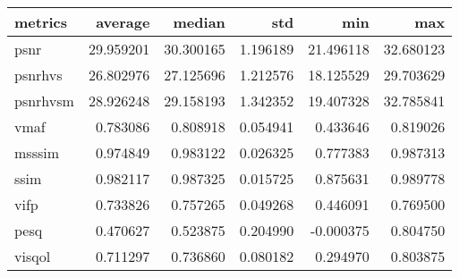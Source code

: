\begin{tabular}{lrrrrr}
\toprule
metrics & average & median & std & min & max \\
\midrule
psnr & 29.959201 & 30.300165 & 1.196189 & 21.496118 & 32.680123 \\
psnrhvs & 26.802976 & 27.125696 & 1.212576 & 18.125529 & 29.703629 \\
psnrhvsm & 28.926248 & 29.158193 & 1.342352 & 19.407328 & 32.785841 \\
vmaf & 0.783086 & 0.808918 & 0.054941 & 0.433646 & 0.819026 \\
msssim & 0.974849 & 0.983122 & 0.026325 & 0.777383 & 0.987313 \\
ssim & 0.982117 & 0.987325 & 0.015725 & 0.875631 & 0.989778 \\
vifp & 0.733826 & 0.757265 & 0.049268 & 0.446091 & 0.769500 \\
pesq & 0.470627 & 0.523875 & 0.204990 & -0.000375 & 0.804750 \\
visqol & 0.711297 & 0.736860 & 0.080182 & 0.294970 & 0.803875 \\
\bottomrule
\end{tabular}
